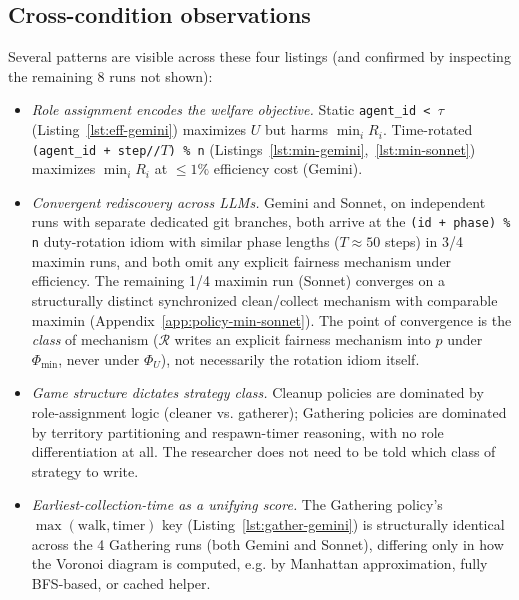 \documentclass{article}
\newcommand{\cR}{\mathcal{R}}
\begin{document}
\subsection{Cross-condition observations}

Several patterns are visible across these four listings (and confirmed by inspecting the remaining 8 runs not shown):

\begin{itemize}
  \item \emph{Role assignment encodes the welfare objective.} Static \texttt{agent\_id < $\tau$} (Listing~\ref{lst:eff-gemini}) maximizes $U$ but harms $\min_i R_i$. Time-rotated \texttt{(agent\_id + step//$T$) \% n} (Listings~\ref{lst:min-gemini},~\ref{lst:min-sonnet}) maximizes $\min_i R_i$ at $\le 1\%$ efficiency cost (Gemini).
  \item \emph{Convergent rediscovery across LLMs.} Gemini and Sonnet, on independent runs with separate dedicated git branches, both arrive at the \texttt{(id + phase) \% n} duty-rotation idiom with similar phase lengths ($T \approx 50$ steps) in 3/4 maximin runs, and both omit any explicit fairness mechanism under efficiency. The remaining 1/4 maximin run (Sonnet) converges on a structurally distinct synchronized clean/collect mechanism with comparable maximin (Appendix~\ref{app:policy-min-sonnet}). The point of convergence is the \emph{class} of mechanism ($\cR$ writes an explicit fairness mechanism into $p$ under $\Phi_{\min}$, never under $\Phi_U$), not necessarily the rotation idiom itself.
  \item \emph{Game structure dictates strategy class.} Cleanup policies are dominated by role-assignment logic (cleaner vs. gatherer); Gathering policies are dominated by territory partitioning and respawn-timer reasoning, with no role differentiation at all. The researcher does not need to be told which class of strategy to write.
  \item \emph{Earliest-collection-time as a unifying score.} The Gathering policy's $\max(\text{walk}, \text{timer})$ key (Listing~\ref{lst:gather-gemini}) is structurally identical across the 4 Gathering runs (both Gemini and Sonnet), differing only in how the Voronoi diagram is computed, e.g. by Manhattan approximation, fully BFS-based, or cached helper.
\end{itemize}
\end{document}
